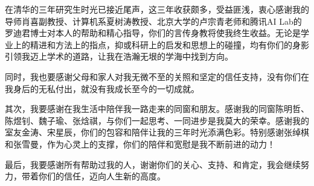
\begin{acknowledgements}
在清华的三年研究生时光已接近尾声，这三年收获颇多，受益匪浅，衷心感谢我的导师肖喜副教授、计算机系夏树涛教授、北京大学的卢宗青老师和腾讯AI Lab的罗迪君博士对本人的帮助和精心指导，你们的言传身教将使我终生收益。无论是学业上的精进和方法上的指点，抑或科研上的启发和思想上的碰撞，均有你们的身影引领我迈上学术的道路，让我在浩瀚无垠的学海中找到方向。

同时，我也要感谢父母和家人对我无微不至的关照和坚定的信任支持，没有你们在我身后的无私付出，就没有我成长至今的一切成就。

其次，我要感谢在我生活中陪伴我一路走来的同窗和朋友。感谢我的同窗陈明哲、陈煜钊、魏子瑜、张焓祺，与你们一起思考、一同进步是我莫大的荣幸。感谢我的室友金涛、宋星辰，你们的包容和陪伴让我的三年时光添满色彩。特别感谢张绰棋和张雪曼，作为心灵上的支撑，你们的陪伴和宽慰是我不断前进的动力！

最后，我要感谢所有帮助过我的人，谢谢你们的关心、支持、和肯定，我会继续努力，带着你们的信任，迈向人生新的高度。
\end{acknowledgements}
